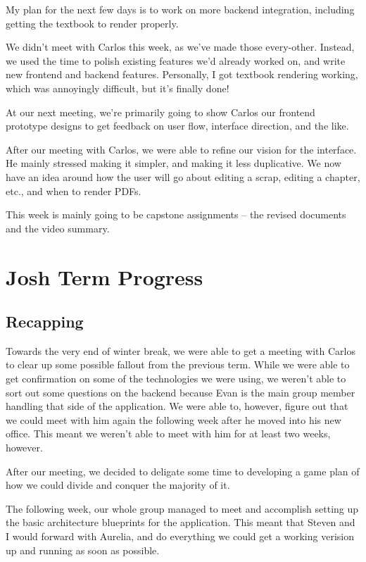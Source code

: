 \documentclass[onecolumn, draftclsnofoot,10pt, compsoc]{IEEEtran}
\begin{document}
My plan for the next few days is to work on more backend integration, 
including getting the textbook to render properly.

We didn't meet with Carlos this week, as we've made those every-other. 
Instead, we used the time to polish existing features we'd already worked on, 
and write new frontend and backend features. Personally, I got textbook 
rendering working, which was annoyingly difficult, but it's finally done!

At our next meeting, we're primarily going to show Carlos our frontend 
prototype designs to get feedback on user flow, interface direction, 
and the like.

After our meeting with Carlos, we were able to refine our vision for the 
interface. He mainly stressed making it simpler, and making it less duplicative. 
We now have an idea around how the user will go about editing a scrap, editing 
a chapter, etc., and when to render PDFs.

This week is mainly going to be capstone assignments -- the revised documents 
and the video summary.


\section{Josh Term Progress}
\subsection{Recapping}
Towards the very end of winter break, we were able to get a meeting with Carlos to clear 
up some possible fallout from the previous term. While we were able to get 
confirmation on some of the technologies we were using, we weren't able to sort out some 
questions on the backend because Evan is the main group member handling that side of the 
application. We were able to, however, figure out that we could meet with 
him again the following week after he moved into his new office. This meant we weren't 
able to meet with him for at least two weeks, however.

After our meeting, we decided to deligate some time to developing a game plan of how we 
could divide and conquer the majority of it.

The following week, our whole group managed to meet and accomplish setting up the basic
architecture blueprints for the application. This meant that Steven and I would forward 
with Aurelia, and do everything we could get a working verision up and running as soon 
as possible.
\end{document}

